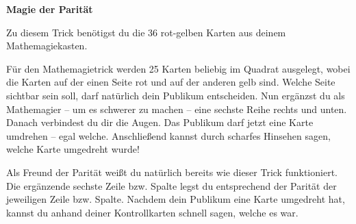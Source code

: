 \documentclass[a5paper,ngerman,12pt]{scrartcl}
\begin{document}
\newpage

\begin{center}
  \Huge\bf\sffamily
  Magie der Parität
\end{center}

Zu diesem Trick benötigst du die 36 rot-gelben Karten aus deinem
Mathemagiekasten.

Für den Mathemagietrick werden 25 Karten beliebig im Quadrat ausgelegt, wobei
die Karten auf der einen Seite rot und auf der anderen gelb sind. 
Welche Seite sichtbar sein soll, darf natürlich dein Publikum entscheiden. Nun
ergänzst du als Mathemagier -- um es schwerer zu machen -- eine sechste Reihe
rechts und unten. Danach verbindest du dir die Augen. Das Publikum darf jetzt
eine Karte umdrehen -- egal welche. Anschließend kannst durch scharfes
Hinsehen sagen, welche Karte umgedreht wurde!

Als Freund der Parität weißt du natürlich bereits wie dieser Trick
funktioniert. Die ergänzende sechste Zeile bzw. Spalte legst du entsprechend
der Parität der jeweiligen Zeile bzw. Spalte. Nachdem dein Publikum eine Karte umgedreht
hat, kannst du anhand deiner Kontrollkarten schnell sagen, welche es
war.
\end{document}
